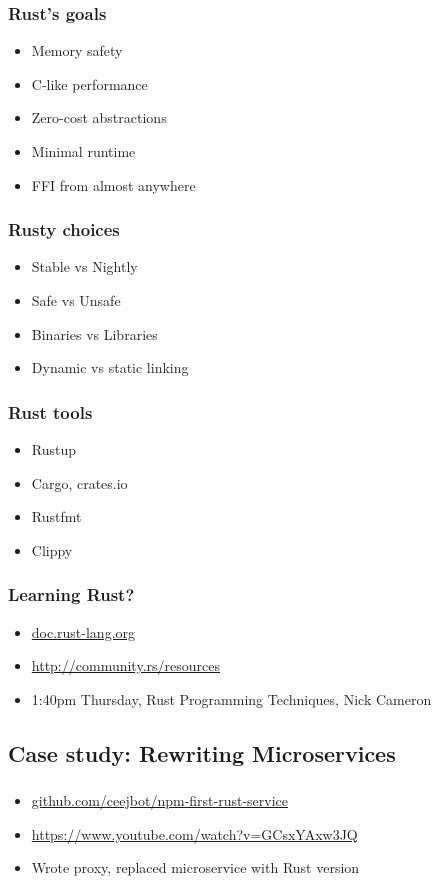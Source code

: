 \documentclass{beamer}
\begin{document}
\begin{frame}[fragile]
\frametitle{Rust's goals}
\begin{itemize}[<+(1)->]
\item Memory safety
\item C-like performance
\item Zero-cost abstractions
\item Minimal runtime
\item FFI from almost anywhere
\end{itemize}
\end{frame}

\begin{frame}[fragile]
\frametitle{Rusty choices}
\begin{itemize}[<+(1)->]
\item Stable vs Nightly
\item Safe vs Unsafe
\item Binaries vs Libraries
\item Dynamic vs static linking
\end{itemize}
\end{frame}

\begin{frame}[fragile]
\frametitle{Rust tools}
\begin{itemize}[<+(1)->]
\item Rustup
\item Cargo, crates.io
\item Rustfmt
\item Clippy
\end{itemize}
\end{frame}

\begin{frame}[fragile]
\frametitle{Learning Rust?}
\begin{itemize}[<+(1)->]
\item \url{doc.rust-lang.org}
\item \url{http://community.rs/resources}
\item 1:40pm Thursday, Rust Programming Techniques, Nick Cameron
\end{itemize}
\end{frame}

\subsection{Case study: Rewriting Microservices}

\begin{frame}[fragile]
\frametitle{\insertsubsectionhead}
\begin{itemize}[<+(1)->]
\item \url{github.com/ceejbot/npm-first-rust-service}
\item \url{https://www.youtube.com/watch?v=GCsxYAxw3JQ}
\item Wrote proxy, replaced microservice with Rust version
\end{itemize}
\end{frame}
\end{document}
